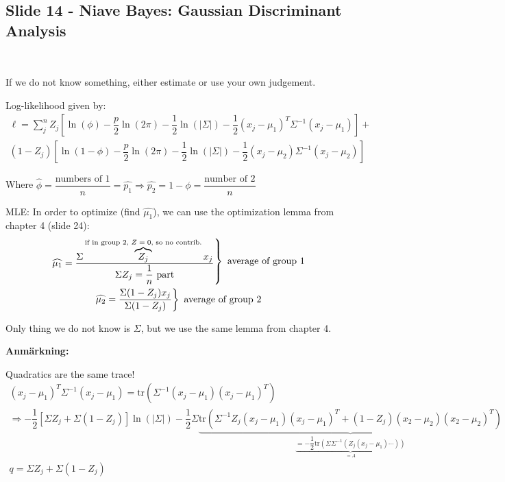 \subsection{Slide 14 - Niave Bayes: Gaussian Discriminant Analysis}\hfill\\\par
\noindent If we do not know something, either estimate or use your own judgement.
\par\bigskip
\noindent Log-likelihood given by:
\begin{equation*}
  \begin{gathered}
    \ell = \sum_{j}^{n}Z_j\left[\ln{\left(\phi\right)}-\dfrac{p}{2}\ln{\left(2\pi\right)}-\dfrac{1}{2}\ln{\left(\left|\Sigma\right|\right)}-\dfrac{1}{2}(x_j-\mu_1)^T\Sigma^{-1}(x_j-\mu_1)\right]+\\\left(1-Z_j\right)\left[\ln{\left(1-\phi\right)}-\dfrac{p}{2}\ln{\left(2\pi\right)}-\dfrac{1}{2}\ln{\left(\left|\Sigma\right|\right)}-\dfrac{1}{2}(x_j-\mu_2)\Sigma^{-1}(x_j-\mu_2)\right]
  \end{gathered}
\end{equation*}\par
\noindent Where $\widehat{\phi} = \dfrac{\text{numbers of 1}}{n} = \widehat{p_1}\Rightarrow \widehat{p_2} = 1-\phi = \dfrac{\text{number of 2}}{n}$
\par\bigskip
\noindent MLE: In order to optimize (find $\widehat{\mu_1}$), we can use the optimization lemma from chapter 4 (slide 24):
\begin{equation*}
  \begin{gathered}
    \begin{rcases*}
      \widehat{\mu_1} = \dfrac{\Sigma \overbrace{Z_j}^{\text{if in group 2, $Z = 0$, so no contrib.}}x_j}{\Sigma Z_j = \dfrac{1}{n}\text{ part}}
    \end{rcases*}\text{ average of group 1}\\
    \begin{rcases*}
      \widehat{\mu_2} = \dfrac{\Sigma(1-Z_j)x_j}{\Sigma(1-Z_j)}
    \end{rcases*} \text{ average of group 2}
  \end{gathered}
\end{equation*}
\par\bigskip
\noindent Only thing we do not know is $\Sigma$, but we use the same lemma from chapter 4.
\par\bigskip
\noindent\textbf{Anmärkning:}\par
\noindent Quadratics are the same trace!
\begin{equation*}
  \begin{gathered}
    (x_j-\mu_1)^T\Sigma^{-1}(x_j-\mu_1) = \text{tr}\left(\Sigma^{-1}(x_j-\mu_1)(x_j-\mu_1)^T\right)\\
    \Rightarrow -\dfrac{1}{2}\left[\Sigma Z_j+\Sigma(1-Z_j)\right]\ln{\left(\left|\Sigma\right|\right)}-\dfrac{1}{2}\Sigma\underbrace{\text{tr}\left(\Sigma^{-1}Z_j(x_j-\mu_1)(x_j-\mu_1)^T + (1-Z_j)(x_2-\mu_2)(x_2-\mu_2)^T\right)}_{\underbrace{=-\dfrac{1}{2}\text{tr}\left(\Sigma\Sigma^{-1}\left(Z_j(x_j-\mu_1)\cdots\right)\right)}_{=A}}\\
    q = \Sigma Z_j+\Sigma (1-Z_j)
  \end{gathered}
\end{equation*}
